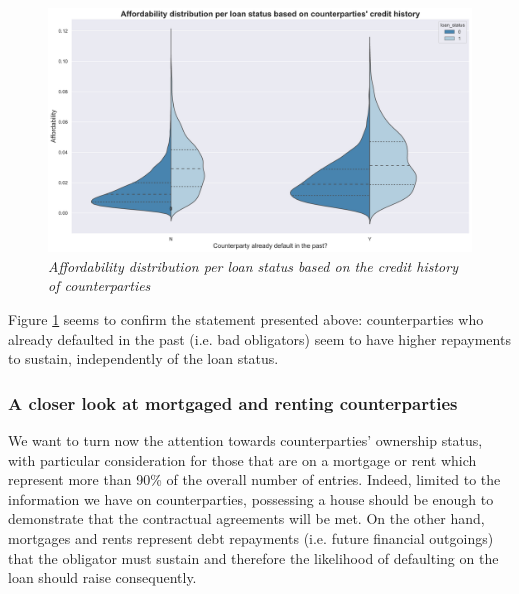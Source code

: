\documentclass[a4paper,12pt]{article}
\begin{document}
        \begin{figure}[H]
            \centerline{
                \includegraphics[width=\linewidth]{./images/loans_affordability_status_credit_history.png}
            }
            \caption{\textit{Affordability distribution per loan status based on the credit history of counterparties}}
            \label{fig:loans_affordability_status_credit_history}
        \end{figure}

    Figure \ref{fig:loans_affordability_status_credit_history} seems to confirm the statement presented above: 
    counterparties who already defaulted in the past (i.e. bad obligators) seem to have higher 
    repayments to sustain, independently of the loan status.

    \subsubsection{A closer look at mortgaged and renting counterparties}
    We want to turn now the attention towards counterparties' ownership status, with particular consideration 
    for those that are on a mortgage or rent which represent more than 90\% of the overall number of entries.
    Indeed, limited to the information we have on counterparties, possessing a house should be enough to 
    demonstrate that the contractual agreements will be met. On the other hand, mortgages and rents represent debt repayments 
    (i.e. future financial outgoings) that the obligator must sustain and therefore the likelihood of defaulting 
    on the loan should raise consequently.
\end{document}
